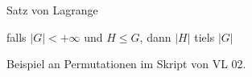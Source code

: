 \documentclass[class=article, crop=false]{standalone}
\begin{document}
\begin{zettel}{Satz von Lagrange}
\begin{flashcard}
    \begin{theorem}
        falls $ |G| <  + \infty $ und $H \leq G$, dann $ |H|$ tiels $ |G|$ 
    \end{theorem}
\end{flashcard}
\begin{example}
    Beispiel an Permutationen im Skript von VL 02.
\end{example}
\end{zettel}
\end{document}
